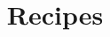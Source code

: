 \documentclass{book}
\author{}
\title{Recipes}
\begin{document}
\maketitle{}
\newpage



\end{document}
